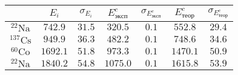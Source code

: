 \begin{tabular}{| c | c | c | c | c | c | c |}
\hline
{} & $E_i$ & $\sigma_{E_i}$ & $E^c_{эксп}$ & $\sigma_{E^c_{эксп}}$ & $E^c_{теор}$ & $\sigma_{E^c_{теор}}$\\
\hline
$^{22}\text{Na}$ & $742.9$ & $31.5$ & $320.5$ & $0.1$ & $552.8$ & $29.4$\\
\hline
$^{137}\text{Cs}$ & $949.9$ & $36.3$ & $482.2$ & $0.1$ & $748.6$ & $34.6$\\
\hline
$^{60}\text{Co}$ & $1692.1$ & $51.8$ & $973.3$ & $0.1$ & $1470.1$ & $50.9$\\
\hline
$^{22}\text{Na}$ & $1840.2$ & $54.8$ & $1075.0$ & $0.1$ & $1615.8$ & $53.9$\\
\hline
\end{tabular}
